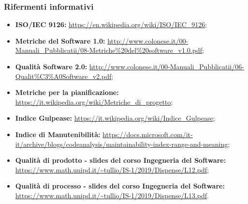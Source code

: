 \subsubsection{Rifermenti informativi}
\begin{itemize}
\item \textbf{ISO/IEC 9126:} \url{https://en.wikipedia.org/wiki/ISO/IEC_9126};
\item \textbf{Metriche del Software 1.0:} \url{http://www.colonese.it/00-Manuali_Pubblicatii/08-Metriche\%20del\%20software_v1.0.pdf};
\item \textbf{Qualità Software 2.0:} \url{http://www.colonese.it/00-Manuali_Pubblicatii/06-Qualit\%C3\%A0Software_v2.pdf};
\item \textbf{Metriche per la pianificazione:} \url{https://it.wikipedia.org/wiki/Metriche_di_progetto};
\item \textbf{Indice Gulpease:} \url{https://it.wikipedia.org/wiki/Indice_Gulpease};
\item \textbf{Indice di Manutenibilità:} \url{https://docs.microsoft.com/it-it/archive/blogs/codeanalysis/maintainability-index-range-and-meaning};
\item \textbf{Qualità di prodotto - slides del corso Ingegneria del Software:} \url{https://www.math.unipd.it/~tullio/IS-1/2019/Dispense/L12.pdf};
\item \textbf{Qualità di processo - slides del corso Ingegneria del Software:} \url{https://www.math.unipd.it/~tullio/IS-1/2019/Dispense/L13.pdf}.
\end{itemize}
